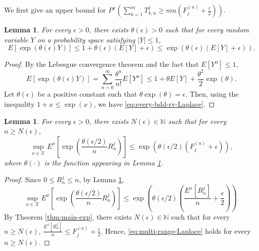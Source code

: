 \documentclass[a4paper, reqno, 11pt]{amsart}
\newtheorem{Lem}[Thm]{Lemma}
\theoremstyle{definition}
\begin{document}
We first give an upper bound for  $\displaystyle P^x \left(  \sum_{k=1}^{m}   T^{j}_{k,n} \ge mn \left(F_j^{(u)} + \frac{\epsilon}{2} \right) \right)$. 

\begin{Lem}\label{lem:Laplace-estimate-bdd}
For every $\epsilon > 0$, there exists $\theta(\epsilon) > 0$ such that 
for every random variable $Y$ on a probability space satisfying $|Y| \le 1$, 
\begin{equation}\label{eq:every-bdd-rv-Laplace}
E\left[\exp(\theta(\epsilon) Y) \right] \le 1 + \theta(\epsilon) (E[Y] + \epsilon) \le \exp\left(  \theta(\epsilon) (E[Y] + \epsilon) \right). 
\end{equation}
\end{Lem}

\begin{proof}
By the Lebesgue convergence theorem and the fact that $E[Y^n] \le 1$, 
\[  E\left[\exp(\theta(\epsilon) Y) \right] = \sum_{n=0}^{\infty} \frac{\theta^n}{n!} E[Y^n] \le 1 + \theta E[Y] + \frac{\theta^2}{2} \exp(\theta).    \]
Let $\theta(\epsilon)$ be a positive constant such that 
$\theta \exp(\theta) = \epsilon$. 
Then, using the inequality $1+x \le \exp(x)$, 
we have \eqref{eq:every-bdd-rv-Laplace}. 
\end{proof}


\begin{Lem}\label{lem:Laplace-estimate-multi-range}
For every $\epsilon > 0$, there exists  $N(\epsilon) \in \mathbb{N}$ such that 
for every $n \ge N(\epsilon)$, 
\begin{equation}\label{eq:multi-range-Laplace}
\sup_{x \in \mathcal{X}} E^x \left[\exp\left(\frac{\theta(\epsilon/2)}{n} R_n^j \right) \right] \le \exp\left(\theta(\epsilon/2) (F_j^{(u)} + \epsilon) \right),
\end{equation}
where $\theta (\cdot)$ is the function appearing in Lemma \ref{lem:Laplace-estimate-bdd}.  
\end{Lem}

\begin{proof}
Since $0 \le R^j_n \le n$, 
by Lemma \ref{lem:Laplace-estimate-bdd}, 
\[ \sup_{x \in \mathcal{X}} E^x \left[\exp\left(\frac{\theta(\epsilon/2)}{n} R_n^j \right) \right] \le \exp\left(  \theta(\epsilon/2) \left(\frac{E^x \left[R_n^j \right] }{n} + \frac{\epsilon}{2} \right) \right). \]
By Theorem \ref{thm:main-exp}, 
there exists $N(\epsilon) \in \mathbb{N}$ such that 
for every $n \ge N(\epsilon)$, 
$\displaystyle \frac{E^x \left[R_n^j \right] }{n} \le F_j^{(u)} + \frac{\epsilon}{2}$. 
Hence, 
\eqref{eq:multi-range-Laplace} holds for every $n \ge N(\epsilon)$. 
\end{proof}
\end{document}

